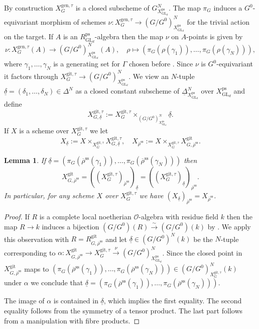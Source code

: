 \documentclass{amsart}
\newtheorem{lem}[prop]{Lemma}
\theoremstyle{definition}
\theoremstyle{remark}
\DeclareMathOperator{\GL}{GL}
\newcommand{\OO}{\mathcal O}
\newcommand{\rhobar}{\overline{\rho}}
\newcommand{\ps}{\mathrm{ps}}
\newcommand{\gen}{\mathrm{gen}}
\newcommand{\gps}{\mathrm{git}}
\newcommand{\RpsGLd}{R^{\ps}_{\GL_d}}
\newcommand{\XpsGLd}{X^{\ps}_{\GL_d}}
\newcommand{\XgpsGtau}{X^{\gps, \tau}_{G}}
\newcommand{\rhobarss}{\rhobar^{\mathrm{ss}}}
\begin{document}
By construction 
 $X^{\gen,\tau}_G$ is a closed subscheme of $G_{\XpsGLd}^N$. The map $\pi_G$ induces a $G^0$-equivariant morphism
of schemes $\nu: X^{\gen,\tau}_G\rightarrow (G/ G^0)^N_{\XpsGLd}$ for the trivial action on the target. 
If $A$ is an $\RpsGLd$-algebra 
then the map $\nu$ on $A$-points is given by 
\begin{equation}\label{nu}
\nu: X^{\gen,\tau}_G(A)\rightarrow (G/G^0)_{\XpsGLd}^N(A), \quad \rho\mapsto (\pi_G(\rho(\gamma_1)), \ldots, 
\pi_G(\rho(\gamma_N))),
\end{equation}
where $\gamma_1, \ldots, \gamma_N$ is a generating set for $\Gamma$ chosen before .
Since $\nu$ is $G^0$-equivariant it factors through $X^{\gps,\tau}_G\rightarrow  (G/ G^0)^N_{\XpsGLd}$.
We  view an $N$-tuple 
$\underline{\delta}=(\delta_1, \ldots, \delta_N)\in \Delta^N$ as a closed constant subscheme 
of $\underline{\Delta}^N_{\XpsGLd}$ over $\XpsGLd$ and define 
$$X^{\gps,\tau}_{G, \underline{\delta}}:= X^{\gps,\tau}_G\times_{(G/G^0)^N_{\XpsGLd}} \underline{\delta}.$$
If $X$ is a scheme over $X^{\gps, \tau}_G$ we let 
\begin{equation}\label{eq_notation}
X_{\underline{\delta}}:= X\times_{\XgpsGtau} X^{\gps,\tau}_{G, \underline{\delta}}, \quad  
X_{\rhobarss}:= X \times_{\XgpsGtau} X^{\gps}_{G, \rhobarss}.
\end{equation}

\begin{lem}\label{connected_Delta} If $\underline{\delta}=(\pi_G(\rhobarss(\gamma_1)), \ldots, \pi_G(\rhobarss(\gamma_N)))$ then 
 $$ X^{\gps}_{G, \rhobarss} = ((\XgpsGtau)_{\rhobarss})_{\underline{\delta}}
 = ((\XgpsGtau)_{\underline{\delta}})_{\rhobarss}.$$ 
 In particular, for any scheme $X$ over $\XgpsGtau$ we have $(X_{\underline{\delta}})_{\rhobarss}= X_{\rhobarss}$.
 \end{lem}
\begin{proof} If $R$ is a complete local noetherian $\OO$-algebra with residue field 
$k$ then the map $R\rightarrow k$ induces a bijection $(G/G^0)(R)\overset{\sim}{\longrightarrow} (G/G^0)(k)$ by \cite[Exp.\,I, Cor.\,6.2]{SGA1}.  
We apply this observation with $R=R^{\gps}_{G,\rhobarss}$ and let 
$\underline{\delta}\in (G/G^0)^N(k)$ be the $N$-tuple 
 corresponding to $\alpha: X^{\gps}_{G, \rhobarss} \rightarrow \XgpsGtau \overset{\nu}{\rightarrow} 
(G/G^0)^N_{\XpsGLd}$. Since the closed point in $X^{\gps}_{G, \rhobarss}$ maps to 
$(\pi_G(\rhobarss(\gamma_1)), \ldots, \pi_G(\rhobarss(\gamma_N)))\in (G/G^0)^N_{\XgpsGtau}(k)$ under $\alpha$ 
we conclude that $\underline{\delta}=(\pi_G(\rhobarss(\gamma_1)), \ldots, \pi_G(\rhobarss(\gamma_N)))$.

The image of $\alpha$ is contained in $\underline{\delta}$, which implies the first 
equality. The second equality follows from the symmetry of a tensor product. The last part 
 follows from a manipulation with fibre products. 
\end{proof}
\end{document}
